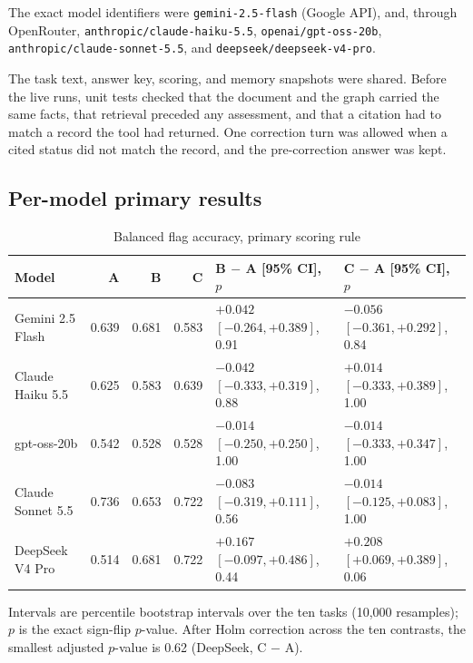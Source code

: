 \documentclass[11pt]{article}
\begin{document}
The exact model identifiers were \texttt{gemini-2.5-flash} (Google API), and, through OpenRouter, \texttt{anthropic/claude-haiku-5.5}, \texttt{openai/gpt-oss-20b}, \texttt{anthropic/claude-sonnet-5.5}, and \texttt{deepseek/deepseek-v4-pro}.

The task text, answer key, scoring, and memory snapshots were shared. Before the live runs, unit tests checked that the document and the graph carried the same facts, that retrieval preceded any assessment, and that a citation had to match a record the tool had returned. One correction turn was allowed when a cited status did not match the record, and the pre-correction answer was kept.


\subsection{Per-model primary results}
\label{app:permodel}

\begin{table}[ht]
\centering
\caption{Balanced flag accuracy, primary scoring rule}
\label{tab:primary}
\small
\begin{tabular}{lrrrll}
\toprule
Model & A & B & C & B $-$ A [95\% CI], $p$ & C $-$ A [95\% CI], $p$ \\
\midrule
Gemini 2.5 Flash & 0.639 & 0.681 & 0.583 & $+0.042$ $[-0.264, +0.389]$, 0.91 & $-0.056$ $[-0.361, +0.292]$, 0.84 \\
Claude Haiku 5.5 & 0.625 & 0.583 & 0.639 & $-0.042$ $[-0.333, +0.319]$, 0.88 & $+0.014$ $[-0.333, +0.389]$, 1.00 \\
gpt-oss-20b & 0.542 & 0.528 & 0.528 & $-0.014$ $[-0.250, +0.250]$, 1.00 & $-0.014$ $[-0.333, +0.347]$, 1.00 \\
Claude Sonnet 5.5 & 0.736 & 0.653 & 0.722 & $-0.083$ $[-0.319, +0.111]$, 0.56 & $-0.014$ $[-0.125, +0.083]$, 1.00 \\
DeepSeek V4 Pro & 0.514 & 0.681 & 0.722 & $+0.167$ $[-0.097, +0.486]$, 0.44 & $+0.208$ $[+0.069, +0.389]$, 0.06 \\
\bottomrule
\end{tabular}

\vspace{0.4em}
\begin{minipage}{0.92\linewidth}\footnotesize
Intervals are percentile bootstrap intervals over the ten tasks (10,000 resamples); $p$ is the exact sign-flip $p$-value. After Holm correction across the ten contrasts, the smallest adjusted $p$-value is 0.62 (DeepSeek, C $-$ A).
\end{minipage}
\end{table}
\end{document}
